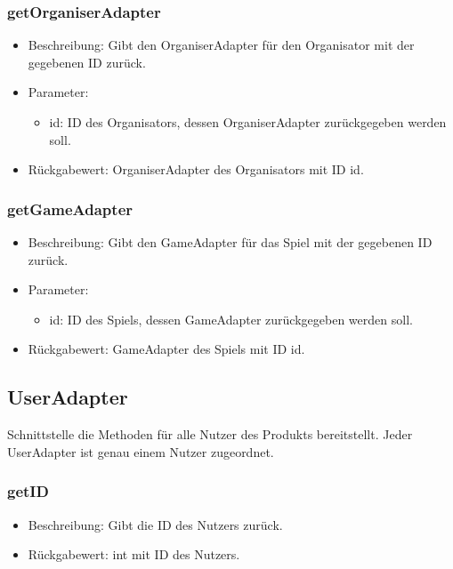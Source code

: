 \documentclass[a4paper]{scrreprt}
\begin{document}
    \subsubsection{getOrganiserAdapter}
    \begin{itemize}
        \item Beschreibung: Gibt den OrganiserAdapter für den Organisator mit der gegebenen ID zurück.
        \item Parameter:
        \begin{itemize}
            \item id: ID des Organisators, dessen OrganiserAdapter zurückgegeben werden soll.
        \end{itemize}
        \item Rückgabewert: OrganiserAdapter des Organisators mit ID id.
    \end{itemize}

    \subsubsection{getGameAdapter}
    \begin{itemize}
        \item Beschreibung: Gibt den GameAdapter für das Spiel mit der gegebenen ID zurück.
        \item Parameter:
        \begin{itemize}
            \item id: ID des Spiels, dessen GameAdapter zurückgegeben werden soll.
        \end{itemize}
        \item Rückgabewert: GameAdapter des Spiels mit ID id.
    \end{itemize}

    \subsection{UserAdapter}
    Schnittstelle die Methoden für alle Nutzer des Produkts bereitstellt.
    Jeder UserAdapter ist genau einem Nutzer zugeordnet.

    \subsubsection{getID}
    \begin{itemize}
        \item Beschreibung: Gibt die ID des Nutzers zurück.
        \item Rückgabewert: int mit ID des Nutzers.
    \end{itemize}
\end{document}
